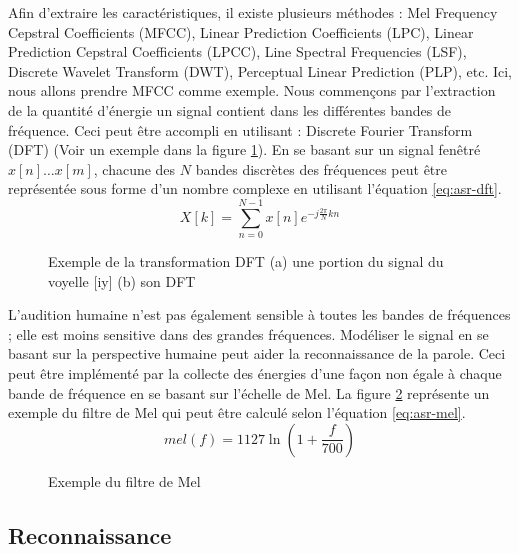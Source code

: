 \documentclass{KodeBook}
\begin{document}
Afin d'extraire les caractéristiques, il existe plusieurs méthodes : Mel Frequency Cepstral Coefficients (MFCC), Linear Prediction Coefficients (LPC), Linear Prediction Cepstral Coefficients (LPCC), Line Spectral Frequencies (LSF), Discrete Wavelet Transform (DWT), Perceptual Linear Prediction (PLP), etc. 
Ici, nous allons prendre MFCC comme exemple.
Nous commençons par l'extraction de la quantité d'énergie un signal contient dans les différentes bandes de fréquence. 
Ceci peut être accompli en utilisant : Discrete Fourier Transform (DFT) (Voir un exemple dans la figure \ref{fig:asr-dft-exp}).
En se basant sur un signal fenêtré $x[n] \ldots x[m]$, chacune des $N$ bandes discrètes des fréquences peut être représentée sous forme d'un nombre complexe en utilisant l'équation \ref{eq:asr-dft}.
\begin{equation}\label{eq:asr-dft}
X[k] = \sum\limits_{n=0}^{N-1} x[n] e^{-j\frac{2\pi}{N} k n}
\end{equation}

\begin{figure}[!ht]
	\centering
	\caption[Exemple de la transformation DFT]{Exemple de la transformation DFT (a) une portion du signal du voyelle [iy] (b) son DFT \cite{2020-jurafsky-martin}}
	\label{fig:asr-dft-exp}
\end{figure}

L'audition humaine n'est pas également sensible à toutes les bandes de fréquences ; elle est moins sensitive dans des grandes fréquences.
Modéliser le signal en se basant sur la perspective humaine peut aider la reconnaissance de la parole. 
Ceci peut être implémenté par la collecte des énergies d'une façon non égale à chaque bande de fréquence en se basant sur l'échelle de Mel. 
La figure \ref{fig:asr-mel} représente un exemple du filtre de Mel qui peut être calculé selon l'équation \ref{eq:asr-mel}.
\begin{equation}\label{eq:asr-mel}
mel(f) = 1127 \ln (1 + \frac{f}{700})
\end{equation}

\begin{figure}[!ht]
	\centering
	\caption[Exemple du filtre de Mel]{Exemple du filtre de Mel \cite{2020-jurafsky-martin}}
	\label{fig:asr-mel}
\end{figure}

\subsection{Reconnaissance}
\end{document}
